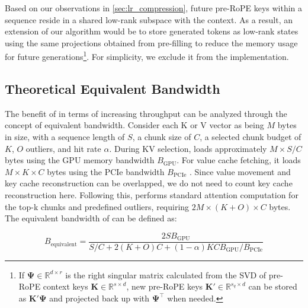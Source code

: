 Based on our observations in \cref{sec:lr_compression}, future pre-RoPE keys within a sequence reside in a shared low-rank subspace with the context. As a result, an extension of our algorithm would be to store generated tokens as low-rank states using the same projections obtained from pre-filling to reduce the memory usage for future generations\footnote{If $\boldsymbol{\Psi} \in \mathbb{R}^{d \times r}$ is the right singular matrix calculated from the SVD of pre-RoPE context keys $\boldsymbol{K} \in \mathbb{R}^{s \times d}$, new pre-RoPE keys $\boldsymbol{K}' \in \mathbb{R}^{s_q \times d}$ can be stored as $\boldsymbol{K}' \boldsymbol{\Psi}$ and projected back up with $\boldsymbol{\Psi}^\top$ when needed.}. For simplicity, we exclude it from the implementation.

\subsection{Theoretical Equivalent Bandwidth}
\label{anal}
The benefit of \Sys in terms of increasing throughput can be analyzed through the concept of equivalent bandwidth. Consider each K or V vector as being $M$ bytes in size, with a sequence length of $S$, a chunk size of $C$, a selected chunk budget of $K$, $O$ outliers, and hit rate $\alpha$. During KV selection, \Sys loads approximately $M \times S/C$ bytes using the GPU memory bandwidth $B_\text{GPU}$. For value cache fetching, it loads $M \times K \times C$ bytes using the PCIe bandwidth $B_\text{PCIe}$ \citep{sheng2023flexgen}. Since value movement and key cache reconstruction can be overlapped, we do not need to count key cache reconstruction here. Following this, \Sys performs standard attention computation for the top-k chunks and predefined outliers, requiring $2M \times (K+O) \times C$ bytes. The equivalent bandwidth of \Sys can be defined as:

\begin{equation*}
    B_\text{equivalent} = \frac{2SB_\text{GPU}}{S/C + 2(K+O)C+ (1-\alpha) KCB_\text{GPU}/B_\text{PCIe}}
\end{equation*}

